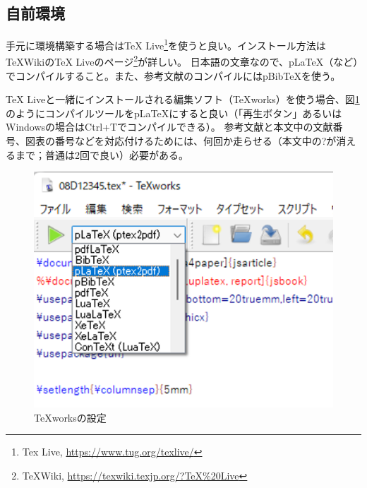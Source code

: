 \documentclass[twocolumn, a4paper]{jsarticle}
\begin{document}
\subsection*{自前環境}
手元に環境構築する場合はTeX Live\footnote{Tex Live, \url{https://www.tug.org/texlive/}}を使うと良い。インストール方法は\TeX WikiのTeX Liveのページ\footnote{\TeX Wiki, \url{https://texwiki.texjp.org/?TeX%20Live}}が詳しい。 
日本語の文章なので、pLaTeX（など）でコンパイルすること。また、参考文献のコンパイルにはpBibTeXを使う。

TeX Liveと一緒にインストールされる編集ソフト（TeXworks）を使う場合、図\ref{fig:texworks}のようにコンパイルツールをpLaTeXにすると良い（「再生ボタン」あるいはWindowsの場合はCtrl+Tでコンパイルできる）。
参考文献と本文中の文献番号、図表の番号などを対応付けるためには、何回か走らせる（本文中の?が消えるまで；普通は2回で良い）必要がある。

\begin{figure}[t]
\centering
\includegraphics[width=\linewidth]{texworks.png}
\caption{TeXworksの設定}
\label{fig:texworks}
\end{figure}
\end{document}
